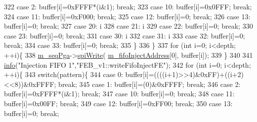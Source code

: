 \begin{DoxyCode}
322     \textcolor{keywordflow}{case} 2:   buffer[i]=0xFFFF*(i&1); \textcolor{keywordflow}{break};
323     \textcolor{keywordflow}{case} 10:  buffer[i]=0x0FFF; \textcolor{keywordflow}{break};
324     \textcolor{keywordflow}{case} 11:  buffer[i]=0xF000; \textcolor{keywordflow}{break};
325     \textcolor{keywordflow}{case} 12:  buffer[i]=0; \textcolor{keywordflow}{break};
326     \textcolor{keywordflow}{case} 13:  buffer[i]=0; \textcolor{keywordflow}{break};
327     \textcolor{keywordflow}{case} 20:  i%
328     \textcolor{keywordflow}{case} 21:  i%
329     \textcolor{keywordflow}{case} 22:  buffer[i]=0; \textcolor{keywordflow}{break};
330     \textcolor{keywordflow}{case} 23:  buffer[i]=0; \textcolor{keywordflow}{break};
331     \textcolor{keywordflow}{case} 30:  i%
332     \textcolor{keywordflow}{case} 31:  i%
333     \textcolor{keywordflow}{case} 32:  buffer[i]=0; \textcolor{keywordflow}{break};
334     \textcolor{keywordflow}{case} 33:  buffer[i]=0; \textcolor{keywordflow}{break};
335     \}
336    \}
337   \textcolor{keywordflow}{for} (\textcolor{keywordtype}{int} i=0; i<depth; ++i)\{
338     \hyperlink{classFEB__v1_a6c7804ac86796f233a8393043adf2e77}{m\_seqPga}->\hyperlink{classSeqPGA_ad4421841ce4ce8b88ad13f63216f0743}{spiWrite}( \hyperlink{classFEB__v1_afd035f292061e1823ed64471bb0228ef}{m\_fifoInjectAddress}[0], buffer[i]);
339   \}
340   
341   \hyperlink{classObject_a644fd329ea4cb85f54fa6846484b84a8}{info}(\textcolor{stringliteral}{"Injection FIFO 1"},\textcolor{stringliteral}{"FEB\_v1::writeFifoInjectFE"});        
342   \textcolor{keywordflow}{for} (\textcolor{keywordtype}{int} i=0; i<depth; ++i)\{ 
343     \textcolor{keywordflow}{switch}(pattern)\{
344     \textcolor{keywordflow}{case} 0:  buffer[i]=((((i+1)>>4)&0xFF)+((i+2)<<8))&0xFFFF; \textcolor{keywordflow}{break};
345     \textcolor{keywordflow}{case} 1:   buffer[i]=(0)&0xFFFF; \textcolor{keywordflow}{break};
346     \textcolor{keywordflow}{case} 2:   buffer[i]=0xFFFF*(i&1); \textcolor{keywordflow}{break};
347     \textcolor{keywordflow}{case} 10:  buffer[i]=0; \textcolor{keywordflow}{break};
348     \textcolor{keywordflow}{case} 11:  buffer[i]=0x00FF; \textcolor{keywordflow}{break};
349     \textcolor{keywordflow}{case} 12:  buffer[i]=0xFF00; \textcolor{keywordflow}{break};
350     \textcolor{keywordflow}{case} 13:  buffer[i]=0; \textcolor{keywordflow}{break};

\end{DoxyCode}
